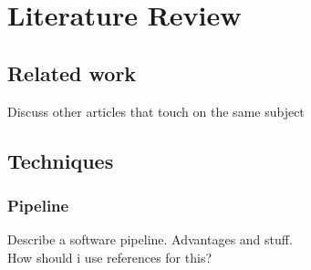 
\chapter{Literature Review}


\section{Related work}
Discuss other articles that touch on the same subject

\section{Techniques}

\subsection{Pipeline} \label{pipeline}
Describe a software pipeline. Advantages and stuff.\\
How should i use references for this?


\cleardoublepage